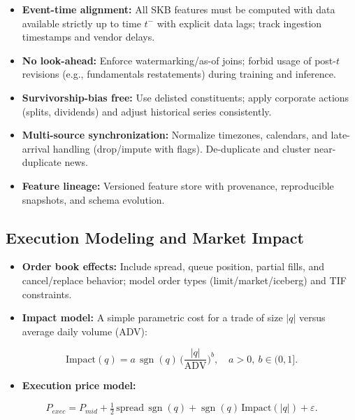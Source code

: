 \documentclass[11pt,a4paper]{article}
\begin{document}
\begin{itemize}
\item   \textbf{Event-time alignment:} All SKB features must be computed with data available strictly up to time $t^{-}$ with explicit data lags; track ingestion timestamps and vendor delays.
\item   \textbf{No look-ahead:} Enforce watermarking/as-of joins; forbid usage of post-$t$ revisions (e.g., fundamentals restatements) during training and inference.
\item   \textbf{Survivorship-bias free:} Use delisted constituents; apply corporate actions (splits, dividends) and adjust historical series consistently.
\item   \textbf{Multi-source synchronization:} Normalize timezones, calendars, and late-arrival handling (drop/impute with flags). De-duplicate and cluster near-duplicate news.
\item   \textbf{Feature lineage:} Versioned feature store with provenance, reproducible snapshots, and schema evolution.

\end{itemize}
\subsection{Execution Modeling and Market Impact}

\begin{itemize}
\item   \textbf{Order book effects:} Include spread, queue position, partial fills, and cancel/replace behavior; model order types (limit/market/iceberg) and TIF constraints.
\item   \textbf{Impact model:} A simple parametric cost for a trade of size $|q|$ versus average daily volume (ADV):

\end{itemize}
\begin{equation}
\text{Impact}(q) = a\,\operatorname{sgn}(q)\,\Big(\frac{|q|}{\mathrm{ADV}}\Big)^b,\quad a>0,\ b\in(0,1].
\end{equation}

\begin{itemize}
\item   \textbf{Execution price model:}

\end{itemize}
\begin{equation}
P_{exec} = P_{mid} + \tfrac{1}{2}\,\text{spread}\,\operatorname{sgn}(q) + \operatorname{sgn}(q)\,\text{Impact}(|q|) + \varepsilon.
\end{equation}
\end{document}
